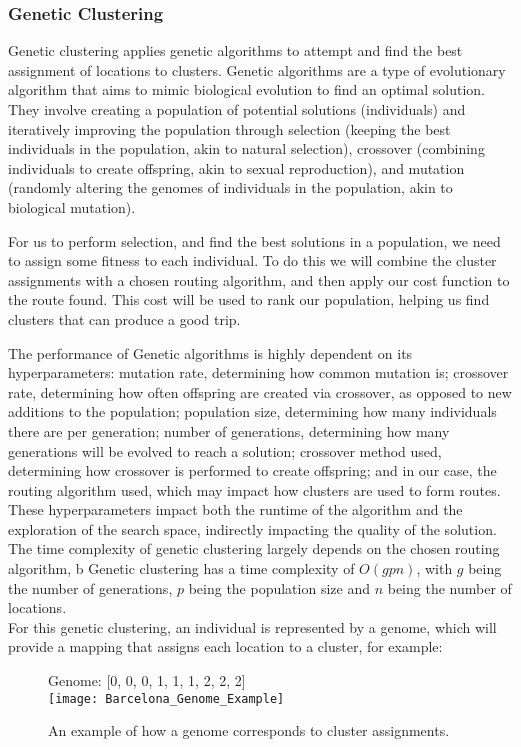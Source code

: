\subsubsection{Genetic Clustering}
Genetic clustering applies genetic algorithms to attempt and find the best assignment of locations to clusters.
Genetic algorithms are a type of evolutionary algorithm that aims to mimic biological evolution to find an optimal
solution.
They involve creating a population of potential solutions (individuals) and iteratively improving the population
through selection (keeping the best individuals in the population, akin to natural selection), crossover (combining
individuals to create offspring, akin to sexual reproduction), and mutation (randomly altering the genomes
of individuals in the population, akin to biological mutation).

For us to perform selection, and find the best solutions in a population, we need to assign some fitness to each
individual.
To do this we will combine the cluster assignments with a chosen routing algorithm, and then apply our cost function
to the route found.
This cost will be used to rank our population, helping us find clusters that can produce a good trip.

The performance of Genetic algorithms is highly dependent on its hyperparameters: mutation rate, determining how
common mutation is; crossover rate, determining how often offspring are created via crossover, as opposed to new
additions to the population; population size, determining how many individuals there are per generation; number of
generations, determining how many generations will be evolved to reach a solution; crossover method used,
determining how crossover is performed to create offspring; and in our case, the routing algorithm used, which may
impact how clusters are used to form routes.
These hyperparameters impact both the runtime of the algorithm and the exploration of the search space, indirectly
impacting the quality of the solution.
The time complexity of genetic clustering largely depends on the chosen routing algorithm, b
Genetic clustering has a time complexity of $O(gpn)$, with $g$ being the number of generations, $p$ being the
population size and $n$ being the number of locations.\\

\noindent
For this genetic clustering, an individual is represented by a genome, which will provide a mapping that assigns each
location to a cluster, for example:
\begin{figure}[H]\label{fig:barcelona-genome-example}
    \centering
    Genome: [0, 0, 0, 1, 1, 1, 2, 2, 2]\\
    \texttt{[image: Barcelona\_Genome\_Example]}
    \caption{An example of how a genome corresponds to cluster assignments.}
\end{figure}

